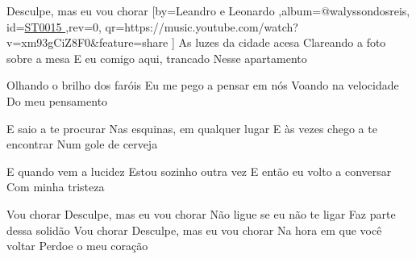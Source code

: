 \beginsong
{Desculpe, mas eu vou chorar %
}[by={Leandro e Leonardo %
},album={@walyssondosreis},
id={\href{https://music.youtube.com/watch?v=xm93gCiZ8F0&feature=share %
}{ST0015 %
}},rev={0}, %
qr={https://music.youtube.com/watch?v=xm93gCiZ8F0&feature=share %
}]
\beginverse
As luzes da cidade acesa
Clareando a foto sobre a mesa
E eu comigo aqui, trancado
Nesse apartamento
\endverse

\beginverse
Olhando o brilho dos faróis
Eu me pego a pensar em nós
Voando na velocidade
Do meu pensamento
\endverse

\beginverse
E saio a te procurar
Nas esquinas, em qualquer lugar
E às vezes chego a te encontrar
Num gole de cerveja
\endverse

\beginverse
E quando vem a lucidez
Estou sozinho outra vez
E então eu volto a conversar
Com minha tristeza
\endverse

\beginchorus
Vou chorar
Desculpe, mas eu vou chorar
Não ligue se eu não te ligar
Faz parte dessa solidão
Vou chorar
Desculpe, mas eu vou chorar
Na hora em que você voltar
Perdoe o meu coração
\endchorus



